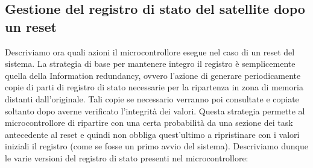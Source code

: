 \documentclass[LaM,binding=0.6cm]{../sapthesis}
\begin{document}
\subsection{Gestione del registro di stato del satellite dopo un reset
}
Descriviamo ora quali azioni il microcontrollore esegue nel caso di un reset del sistema.
La strategia di base per mantenere integro il registro è semplicemente quella della Information redundancy, ovvero l’azione di generare periodicamente copie di parti di registro di stato necessarie per la ripartenza in zona di memoria distanti dall’originale. 
\newline
Tali copie se necessario verranno poi consultate e copiate soltanto dopo averne verificato l’integrità dei valori.
Questa strategia permette al microcontrollore di ripartire con una certa probabilità da una sezione dei task antecedente al reset e quindi non obbliga quest’ultimo a ripristinare con i valori iniziali il registro (come se fosse un primo avvio del sistema).
Descriviamo dunque le varie versioni del registro di stato presenti nel microcontrollore:
\end{document}
